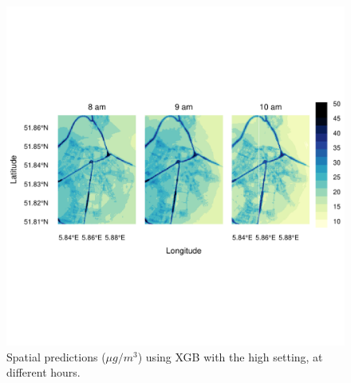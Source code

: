 \documentclass{article}
\begin{document}
\begin{figure}[H]
    \includegraphics[width=\linewidth, trim=1cm 4cm 0cm 2cm, clip=true]{xgbhs.pdf}
    
    \caption {Spatial predictions ($\mu g/m^3$) using XGB with the high setting, at different hours.  }
    \label{xgbhs}
\end{figure}
\end{document}
